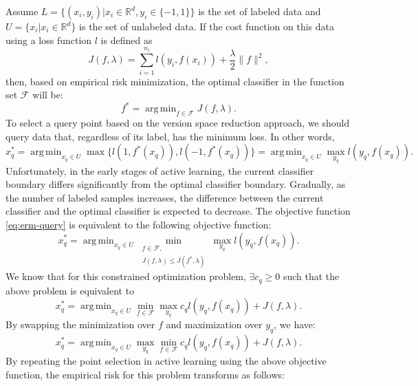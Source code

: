 \documentclass[12pt]{article}
\DeclareMathOperator*{\argmin}{arg\,min}
\begin{document}
	Assume $L = \{(x_i, y_i) | x_i \in \mathbb{R}^d, y_i \in \{-1, 1\}\}$ is the set of labeled data and $U = \{x_i | x_i \in \mathbb{R}^d\}$ is the set of unlabeled data. If the cost function on this data using a loss function $l$ is defined as
	\begin{equation}
		J(f, \lambda) = \sum_{i=1}^{n_l} l(y_i, f(x_i)) + \frac{\lambda}{2}\|f\|^2,
	\end{equation}
	then, based on empirical risk minimization, the optimal classifier in the function set $\mathcal{F}$ will be:
	\begin{equation}
		f^* = \argmin_{f \in \mathcal{F}} J(f, \lambda).
	\end{equation}
	To select a query point based on the version space reduction approach, we should query data that, regardless of its label, has the minimum loss. In other words,
	\begin{equation}
		\label{eq:erm-query}
		x^*_q = \argmin_{x_q \in U} \max\{l(1, f^*(x_q)), l(-1, f^*(x_q))\} = \argmin_{x_q \in U} \max_{y_q} l(y_q, f(x_q)).
	\end{equation}
	Unfortunately, in the early stages of active learning, the current classifier boundary differs significantly from the optimal classifier boundary. Gradually, as the number of labeled samples increases, the difference between the current classifier and the optimal classifier is expected to decrease. The objective function \eqref{eq:erm-query} is equivalent to the following objective function:
	\begin{equation}
		\label{eq:erm-query-constrained}
		x^*_q = \argmin_{x_q \in U} \min_{\substack{f \in \mathcal{F}, \\ J(f,\lambda) \le J(f^*,\lambda)}} \max_{y_q} l(y_q, f(x_q)).
	\end{equation}
	We know that for this constrained optimization problem, $\exists c_q \ge 0$ such that the above problem is equivalent to
	\begin{equation}
		\label{eq:erm-query-lagrange}
		x^*_q = \argmin_{x_q \in U} \min_{f \in \mathcal{F}} \max_{y_q} c_q l(y_q, f(x_q)) + J(f, \lambda).
	\end{equation}
	By swapping the minimization over $f$ and maximization over $y_q$, we have:
	\begin{equation}
		\label{eq:erm-query-swap}
		x^*_q = \argmin_{x_q \in U} \max_{y_q} \min_{f \in \mathcal{F}} c_q l(y_q, f(x_q)) + J(f, \lambda).
	\end{equation}
	By repeating the point selection in active learning using the above objective function, the empirical risk for this problem transforms as follows:
\end{document}
